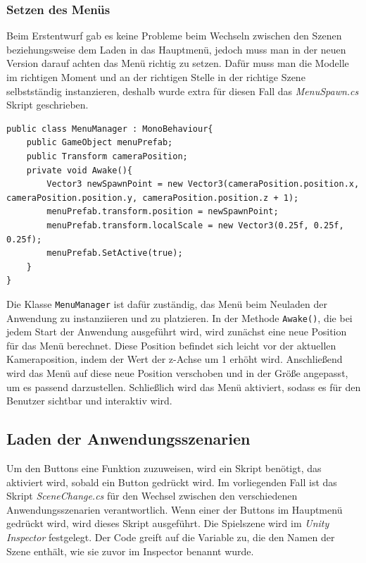 \subsubsection{Setzen des Menüs}
Beim Erstentwurf gab es keine Probleme beim Wechseln zwischen den Szenen beziehungsweise dem Laden in das Hauptmenü, jedoch muss man in der neuen Version darauf achten das Menü richtig zu setzen. Dafür muss man die Modelle im richtigen Moment und an der richtigen Stelle in der richtige Szene selbstständig instanzieren, deshalb wurde extra für diesen Fall das \textit{MenuSpawn.cs} Skript geschrieben.

\begin{lstlisting}[style=csharp, caption=Menueinstanzierung bei Neuladen., label=code:spawnmenu]
public class MenuManager : MonoBehaviour{
    public GameObject menuPrefab;
    public Transform cameraPosition;
    private void Awake(){
        Vector3 newSpawnPoint = new Vector3(cameraPosition.position.x, cameraPosition.position.y, cameraPosition.position.z + 1);
        menuPrefab.transform.position = newSpawnPoint;
        menuPrefab.transform.localScale = new Vector3(0.25f, 0.25f, 0.25f);
        menuPrefab.SetActive(true);
    }
}
\end{lstlisting}

Die Klasse \texttt{MenuManager} ist dafür zuständig, das Menü beim Neuladen der Anwendung zu instanziieren und zu platzieren. In der Methode \texttt{Awake()}, die bei jedem Start der Anwendung ausgeführt wird, wird zunächst eine neue Position für das Menü berechnet. Diese Position befindet sich leicht vor der aktuellen Kameraposition, indem der Wert der z-Achse um 1 erhöht wird. Anschließend wird das Menü auf diese neue Position verschoben und in der Größe angepasst, um es passend darzustellen. Schließlich wird das Menü aktiviert, sodass es für den Benutzer sichtbar und interaktiv wird.

\subsection{Laden der Anwendungsszenarien}
Um den Buttons eine Funktion zuzuweisen, wird ein Skript benötigt, das aktiviert wird, sobald ein Button gedrückt wird.
Im vorliegenden Fall ist das Skript \textit{SceneChange.cs} für den Wechsel zwischen den verschiedenen Anwendungsszenarien verantwortlich.
Wenn einer der Buttons im Hauptmenü gedrückt wird, wird dieses Skript ausgeführt. Die Spielszene wird im \textit{Unity Inspector}
festgelegt. Der Code greift auf die Variable zu, die den Namen der Szene enthält, wie sie zuvor im Inspector benannt wurde.

